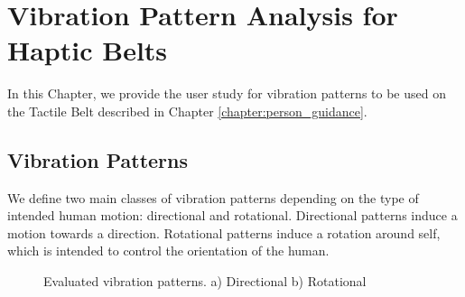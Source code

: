 \chapter{Vibration Pattern Analysis for Haptic Belts}
\label{chapter:vibration_pattern_analysis_for_haptic_belts}

In this Chapter, we provide the user study for vibration patterns to be used on the Tactile Belt described in Chapter \ref{chapter:person_guidance}.

\section{Vibration Patterns}

We define two main classes of vibration patterns depending on the type of intended human motion: directional and rotational. Directional patterns induce a motion towards a direction. Rotational patterns induce a rotation around self, which is intended to control the orientation of the human. 




\begin{figure}[ht!]
\centering
%
    \caption{%
	Evaluated vibration patterns. a) Directional b) Rotational
     }%
   \label{fig:directional_rotational}
\end{figure}

